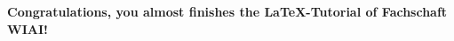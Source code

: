 




\setcounter{page}{2}
\tableofcontents
\newpage
\listoffigures
\newpage
\listoftables
\newpage
\setcounter{page}{1}

\newpage

\newpage


\noindent \textbf{Congratulations, you almost finishes the \LaTeX -Tutorial of Fachschaft WIAI!}

